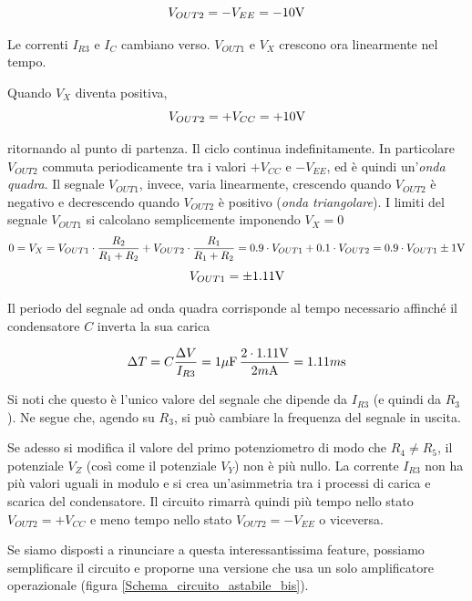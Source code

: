 \documentclass{article}
\begin{document}
\[V_{OUT2} = - V_{EE} = - 10 \textrm V\]

Le correnti $I_{R3}$ e $I_C$ cambiano verso. $V_{OUT1}$ e $V_X$ crescono ora linearmente nel tempo. 

Quando $V_X$ diventa positiva, 
\[V_{OUT2} = + V_{CC} = + 10 \textrm V\]

ritornando al punto di partenza. Il ciclo continua indefinitamente. In particolare $V_{OUT2}$ commuta periodicamente tra i valori $+V_{CC}$ e $-V_{EE}$, ed è quindi un'\textit{onda quadra}. Il segnale $V_{OUT1}$, invece, varia linearmente, crescendo quando $V_{OUT2}$ è negativo e decrescendo quando $V_{OUT2}$ è positivo (\textit{onda triangolare}). I limiti del segnale $V_{OUT1}$ si calcolano semplicemente imponendo $V_X = 0$
\[0 = V_X = V_{OUT1} \cdot \frac{R_2}{R_1 + R_2} + V_{OUT2} \cdot \frac{R_1}{R_1 + R_2} = 0.9 \cdot V_{OUT1} + 0.1 \cdot V_{OUT2} = 0.9 \cdot V_{OUT1} \pm 1 \textrm V\]
\[V_{OUT1} = \pm 1.11 \textrm V\]

Il periodo del segnale ad onda quadra corrisponde al tempo necessario affinché il condensatore $C$ inverta la sua carica

\[\Delta T = C \frac{\Delta V}{I_{R3}} = 1\mu \textrm{F} \,\frac{2 \cdot 1.11 \textrm V}{2m \textrm A} = 1.11 m \textrm s\]

Si noti che questo è l'unico valore del segnale che dipende da $I_{R3}$ (e quindi da $R_3$). Ne segue che, agendo su $R_3$, si può cambiare la frequenza del segnale in uscita.

\vspace{3mm}

Se adesso si modifica il valore del primo potenziometro di modo che $R_4 \neq R_5$, il potenziale $V_Z$ (così come il potenziale $V_Y$) non è più nullo. La corrente $I_{R3}$ non ha più valori uguali in modulo e si crea un’asimmetria tra i processi di carica e scarica del condensatore. Il circuito rimarrà quindi più tempo nello stato $V_{OUT2} = + V_{CC}$ e meno tempo nello stato $V_{OUT2} = - V_{EE}$ o viceversa.

\clearpage
Se siamo disposti a rinunciare a questa interessantissima feature, possiamo semplificare il circuito e proporne una versione che usa un solo amplificatore operazionale (figura \ref{Schema_circuito_astabile_bis}).
\end{document}
